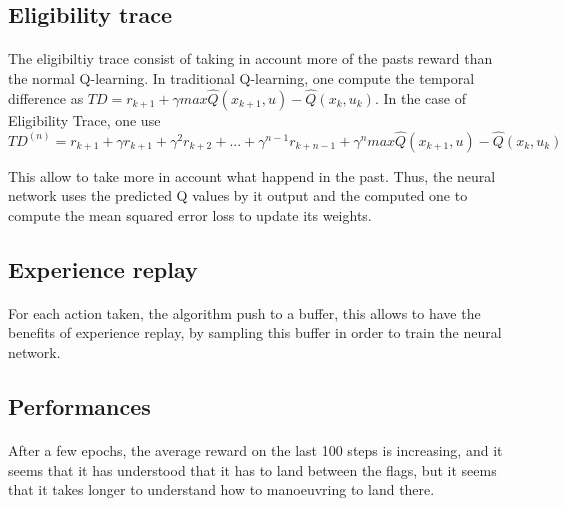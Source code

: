 \documentclass[14pt,a4paper,oneside]{report}
\begin{document}
\subsection{Eligibility trace}
\paragraph{} The eligibiltiy trace consist of taking in account more of the pasts reward than the normal Q-learning. In traditional Q-learning, one compute the temporal difference as $TD = r_{k+1} + \gamma max\hat{Q}(x_{k+1}, u) − \hat{Q}(x_k, u_k)$. In the case of Eligibility Trace, one use $$TD^{(n)} = r_{k+1} + \gamma r_{k+1} + \gamma^2  r_{k+2} + ... + \gamma^{n-1}  r_{k+n-1} + \gamma^n max\hat{Q}(x_{k+1}, u) − \hat{Q}(x_k, u_k)$$

This allow to take more in account what happend in the past. Thus, the neural network uses the predicted Q values by it output and the computed one to compute the mean squared error loss  to update its weights. 

\subsection{Experience replay}
\paragraph{} For each action taken, the algorithm push to a buffer, this allows to have the benefits of experience replay, by sampling this buffer in order to train the neural network. 
\subsection{Performances}
\paragraph{} After a few epochs, the average reward on the last 100 steps is increasing, and it seems that it has understood that it has to land between the flags, but it seems that it takes longer to understand how to manoeuvring to land there. 
\end{document}
